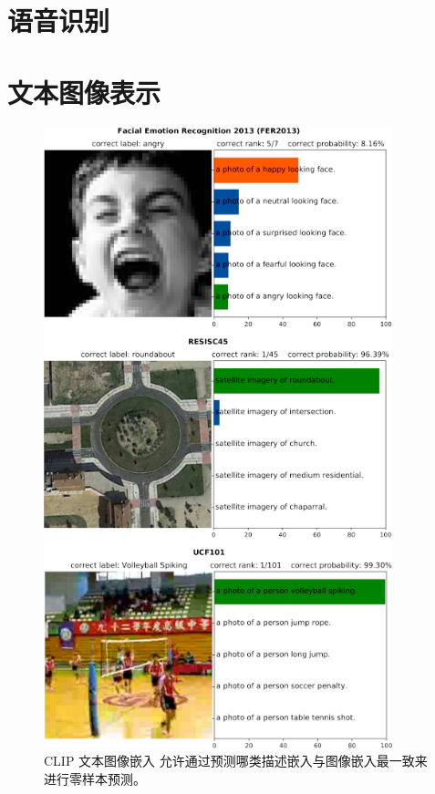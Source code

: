 \section{语音识别}\label{sec6.5}

\section{文本图像表示}\label{sec6.6}

\begin{figure}
    \centering
    \includegraphics[width=0.9\textwidth]{fig/fig6.4.png}
    \caption[CLIP 零样本预测]{CLIP 文本图像嵌入 \citep{arxiv-2103.00020} 允许通过预测哪类描述嵌入与图像嵌入最一致来进行零样本预测。 }
    \label{fig6.4}
\end{figure}

